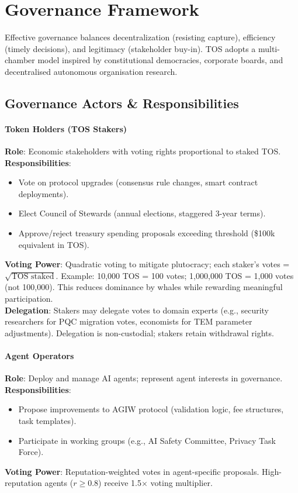 \documentclass[11pt]{article}
\begin{document}
\section{Governance Framework}
\label{sec:governance}

Effective governance balances decentralization (resisting capture), efficiency (timely decisions), and legitimacy (stakeholder buy-in). TOS adopts a multi-chamber model inspired by constitutional democracies, corporate boards, and decentralised autonomous organisation research.

\subsection{Governance Actors \& Responsibilities}

\paragraph{Token Holders (TOS Stakers)}
\textbf{Role}: Economic stakeholders with voting rights proportional to staked TOS.\\
\textbf{Responsibilities}:
\begin{itemize}[noitemsep]
  \item Vote on protocol upgrades (consensus rule changes, smart contract deployments).
  \item Elect Council of Stewards (annual elections, staggered 3-year terms).
  \item Approve/reject treasury spending proposals exceeding threshold (\$100k equivalent in TOS).
\end{itemize}
\textbf{Voting Power}: Quadratic voting to mitigate plutocracy; each staker's votes = $\sqrt{\text{TOS staked}}$. Example: 10,000 TOS = 100 votes; 1,000,000 TOS = 1,000 votes (not 100,000). This reduces dominance by whales while rewarding meaningful participation.\\
\textbf{Delegation}: Stakers may delegate votes to domain experts (e.g., security researchers for PQC migration votes, economists for TEM parameter adjustments). Delegation is non-custodial; stakers retain withdrawal rights.

\paragraph{Agent Operators}
\textbf{Role}: Deploy and manage AI agents; represent agent interests in governance.\\
\textbf{Responsibilities}:
\begin{itemize}[noitemsep]
  \item Propose improvements to AGIW protocol (validation logic, fee structures, task templates).
  \item Participate in working groups (e.g., AI Safety Committee, Privacy Task Force).
\end{itemize}
\textbf{Voting Power}: Reputation-weighted votes in agent-specific proposals. High-reputation agents ($r \geq 0.8$) receive 1.5$\times$ voting multiplier.
\end{document}
